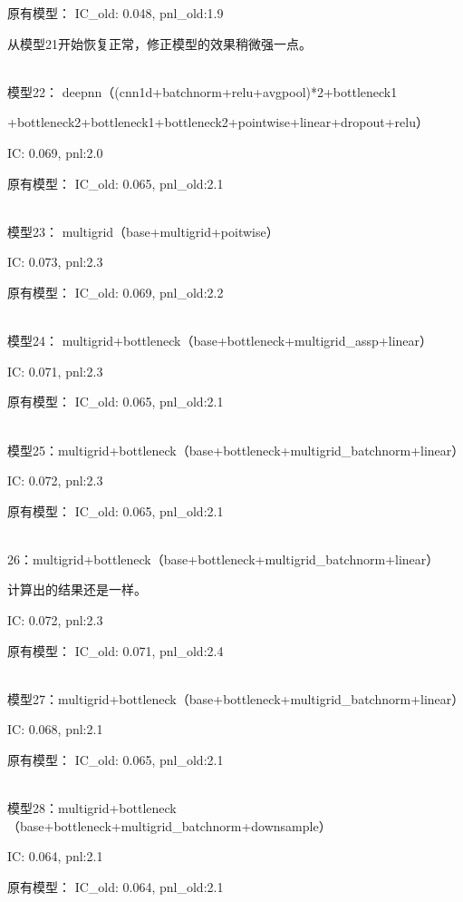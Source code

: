 \documentclass[11pt]{ctexart}
\begin{document}
原有模型：
{\kaishu \small IC\_old: 0.048, pnl\_old:1.9}

从模型21开始恢复正常，修正模型的效果稍微强一点。

~\\
模型22： deepnn（(cnn1d+batchnorm+relu+avgpool)*2+bottleneck1

+bottleneck2+bottleneck1+bottleneck2+pointwise+linear+dropout+relu）

{\kaishu \small IC: 0.069, pnl:2.0}

原有模型：
{\kaishu \small IC\_old: 0.065, pnl\_old:2.1}

~\\
模型23： multigrid（base+multigrid+poitwise）

{\kaishu \small IC: 0.073, pnl:2.3}

原有模型：
{\kaishu \small IC\_old: 0.069, pnl\_old:2.2}

~\\
模型24： multigrid+bottleneck（base+bottleneck+multigrid\_assp+linear）

{\kaishu \small IC: 0.071, pnl:2.3}

原有模型：
{\kaishu \small IC\_old: 0.065, pnl\_old:2.1}

~\\
模型25：multigrid+bottleneck（base+bottleneck+multigrid\_batchnorm+linear）

{\kaishu \small IC: 0.072, pnl:2.3}

原有模型：
{\kaishu \small IC\_old: 0.065, pnl\_old:2.1}

~\\26：multigrid+bottleneck（base+bottleneck+multigrid\_batchnorm+linear）

计算出的结果还是一样。

{\kaishu \small IC: 0.072, pnl:2.3}

原有模型：
{\kaishu \small IC\_old: 0.071, pnl\_old:2.4}

~\\
模型27：multigrid+bottleneck（base+bottleneck+multigrid\_batchnorm+linear）

{\kaishu \small IC: 0.068, pnl:2.1}

原有模型：
{\kaishu \small IC\_old: 0.065, pnl\_old:2.1}

~\\
模型28：multigrid+bottleneck（base+bottleneck+multigrid\_batchnorm+downsample）

{\kaishu \small IC: 0.064, pnl:2.1}

原有模型：
{\kaishu \small IC\_old: 0.064, pnl\_old:2.1}
\end{document}

